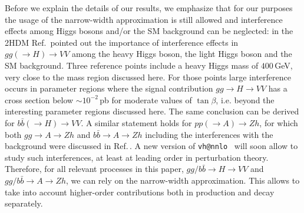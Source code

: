 \documentclass[12pt]{article}
\newcommand{\citere}[1]{Ref.\,\cite{#1}}
\newcommand{\abbrev}{\scalefont{.9}}
\newcommand{\sm}{{\abbrev SM}}
\newcommand{\thdm}{{\abbrev 2HDM}}
\begin{document}
Before we explain the details of our results, we emphasize that for our purposes
the usage of the narrow-width approximation is still allowed and interference
effects among Higgs bosons and/or the \sm{} background can be neglected:
in the \thdm{} \citere{Greiner:2015ixr} pointed out the importance of
interference effects in $gg(\to H)\to VV$ among the heavy Higgs boson,
the light Higgs boson and the \sm{} background. Three reference
points include a heavy Higgs mass of $400$\,GeV, very close to
the mass region discussed here. For those points large interference occurs in
parameter regions where the signal contribution $gg\to H\to VV$
has a cross section below $\sim 10^{-2}$\,pb for moderate values
of $\tan\beta$, i.e. beyond the interesting parameter
regions discussed here. The same conclusion can be derived
for $b\bar b(\to H)\to VV$.
A similar statement holds for $pp(\to A)\to Zh$, for which both
$gg\to A\to Zh$ and $b\bar b\to A\to Zh$ including the interferences
with the background were discussed in \citere{Harlander:2013mla}.
A new version of {\tt vh@nnlo}~\cite{Harlander:2018yio} will soon allow to study
such interferences, at least at leading order in perturbation theory.
Therefore, for all relevant processes in this paper, $gg/b\bar b\to H\to VV$ and
$gg/b\bar b\to A\to Zh$, we can rely on the narrow-width approximation. This allows to take into account higher-order contributions both in production and decay separately.
\end{document}
